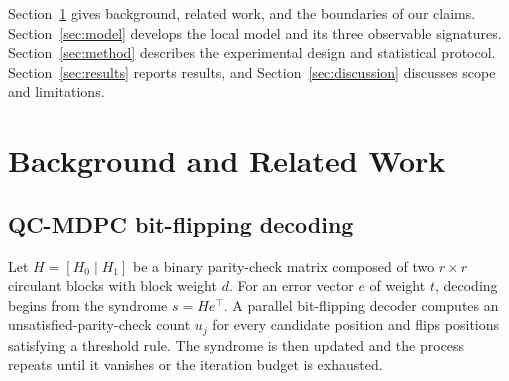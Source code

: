 \documentclass[lettersize,journal]{IEEEtran}
\begin{document}
Section~\ref{sec:background} gives background, related work, and the boundaries of our claims. Section~\ref{sec:model} develops the local model and its three observable signatures. Section~\ref{sec:method} describes the experimental design and statistical protocol. Section~\ref{sec:results} reports results, and Section~\ref{sec:discussion} discusses scope and limitations.

\section{Background and Related Work}\label{sec:background}

\subsection{QC-MDPC bit-flipping decoding}

Let $H=[H_0\mid H_1]$ be a binary parity-check matrix composed of two $r\times r$ circulant blocks with block weight $d$. For an error vector $e$ of weight $t$, decoding begins from the syndrome $s=He^{\top}$. A parallel bit-flipping decoder computes an unsatisfied-parity-check count $u_j$ for every candidate position and flips positions satisfying a threshold rule. The syndrome is then updated and the process repeats until it vanishes or the iteration budget is exhausted.
\end{document}

